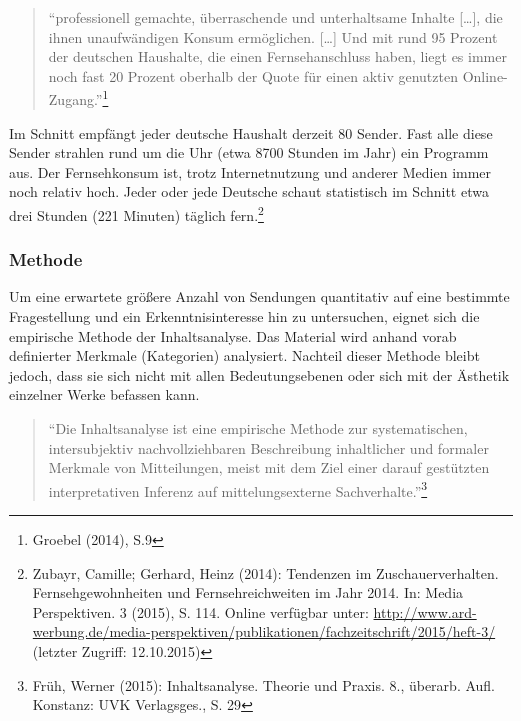 \begin{quote}
\enquote{professionell gemachte, überraschende und unterhaltsame Inhalte
{[}\ldots{}{]}, die ihnen unaufwändigen Konsum ermöglichen.
{[}\ldots{}{]} Und mit rund 95 Prozent der deutschen Haushalte, die
einen Fernsehanschluss haben, liegt es immer noch fast 20 Prozent
oberhalb der Quote für einen aktiv genutzten Online-Zugang.}\footnote{Groebel
  (2014), S.9}
\end{quote}

Im Schnitt empfängt jeder deutsche Haushalt derzeit 80 Sender. Fast alle
diese Sender strahlen rund um die Uhr (etwa 8700 Stunden im Jahr) ein
Programm aus. Der Fernsehkonsum ist, trotz Internetnutzung und anderer
Medien immer noch relativ hoch. Jeder oder jede Deutsche schaut
statistisch im Schnitt etwa drei Stunden (221 Minuten) täglich
fern.\footnote{Zubayr, Camille; Gerhard, Heinz (2014): Tendenzen im
  Zuschauerverhalten. Fernsehgewohnheiten und Fernsehreichweiten im Jahr
  2014. In: Media Perspektiven. 3 (2015), S. 114. Online verfügbar
  unter:
  \url{http://www.ard-werbung.de/media-perspektiven/publikationen/fachzeitschrift/2015/heft-3/}
  (letzter Zugriff: 12.10.2015)}

\subsubsection{Methode}\label{methode}

Um eine erwartete größere Anzahl von Sendungen quantitativ auf eine
bestimmte Fragestellung und ein Erkenntnisinteresse hin zu untersuchen,
eignet sich die empirische Methode der Inhaltsanalyse. Das Material wird
anhand vorab definierter Merkmale (Kategorien) analysiert. Nachteil
dieser Methode bleibt jedoch, dass sie sich nicht mit allen
Bedeutungsebenen oder sich mit der Ästhetik einzelner Werke befassen
kann.

\begin{quote}
\enquote{Die Inhaltsanalyse ist eine empirische Methode zur
systematischen, intersubjektiv nachvollziehbaren Beschreibung
inhaltlicher und formaler Merkmale von Mitteilungen, meist mit dem Ziel
einer darauf gestützten interpretativen Inferenz auf mittelungsexterne
Sachverhalte.}\footnote{Früh, Werner (2015): Inhaltsanalyse. Theorie und
  Praxis. 8., überarb. Aufl. Konstanz: UVK Verlagsges., S. 29}
\end{quote}

